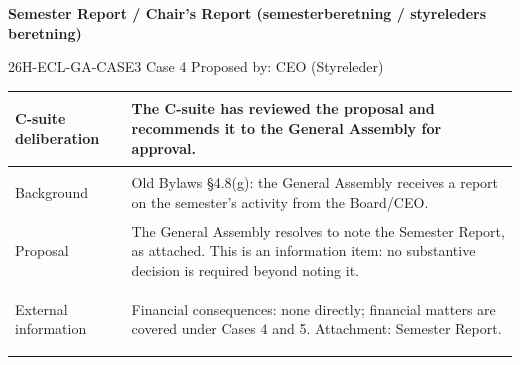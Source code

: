 \documentclass{../../../Common/Latex/Templates/rapport}
\begin{document}
\reportmainmatter
\small
\setlength{\parindent}{0pt}
\setlength{\tabcolsep}{6pt}
\renewcommand{\arraystretch}{1.2}
 
\begin{center}
  {\Large\bfseries Semester Report / Chair's Report (semesterberetning / styreleders beretning)}\par
  \vspace{0.15cm}
  {\normalsize 26H-ECL-GA-CASE3 \textperiodcentered{} Case 4 \textperiodcentered{} Proposed by: CEO (Styreleder)}\par
  \vspace{0.1cm}
  {\small \meetingline}\par
\end{center}

\vspace{0.3cm}
\begin{tabularx}{\textwidth}{|>{\bfseries\raggedright\arraybackslash}p{4.2cm}|X|}
  \hline
  C-suite deliberation & The C-suite has reviewed the proposal and recommends it to the General Assembly for approval.                                                              \\
  \hline
  Background           & Old Bylaws \S4.8(g): the General Assembly receives a report on the semester's activity from the Board/CEO.                                                 \\
  \hline
  Proposal             & The General Assembly resolves to note the Semester Report, as attached. This is an information item: no substantive decision is required beyond noting it. \\
  \hline
  External information & Financial consequences: none directly; financial matters are covered under Cases 4 and 5. Attachment: Semester Report.                                     \\
  \hline
\end{tabularx}
\end{document}
